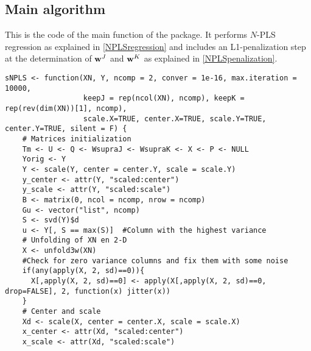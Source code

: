 \subsection{Main algorithm}
This is the code of the main function of the package. It performs $N$-PLS regression as explained in \autoref{NPLSregression} and includes an L1-penalization step at the determination of $\textbf{\text{w}}^{J}$ and $\textbf{\text{w}}^{K}$ as explained in \autoref{NPLSpenalization}.
\begin{scriptsize}
\begin{verbatim}
sNPLS <- function(XN, Y, ncomp = 2, conver = 1e-16, max.iteration = 10000,
                  keepJ = rep(ncol(XN), ncomp), keepK = rep(rev(dim(XN))[1], ncomp),
                  scale.X=TRUE, center.X=TRUE, scale.Y=TRUE, center.Y=TRUE, silent = F) {
    # Matrices initialization
    Tm <- U <- Q <- WsupraJ <- WsupraK <- X <- P <- NULL
    Yorig <- Y
    Y <- scale(Y, center = center.Y, scale = scale.Y)
    y_center <- attr(Y, "scaled:center")
    y_scale <- attr(Y, "scaled:scale")
    B <- matrix(0, ncol = ncomp, nrow = ncomp)
    Gu <- vector("list", ncomp)
    S <- svd(Y)$d
    u <- Y[, S == max(S)]  #Column with the highest variance
    # Unfolding of XN en 2-D
    X <- unfold3w(XN)
    #Check for zero variance columns and fix them with some noise
    if(any(apply(X, 2, sd)==0)){
      X[,apply(X, 2, sd)==0] <- apply(X[,apply(X, 2, sd)==0, drop=FALSE], 2, function(x) jitter(x))
    }
    # Center and scale
    Xd <- scale(X, center = center.X, scale = scale.X)
    x_center <- attr(Xd, "scaled:center")
    x_scale <- attr(Xd, "scaled:scale")


\end{verbatim}
\end{scriptsize}
